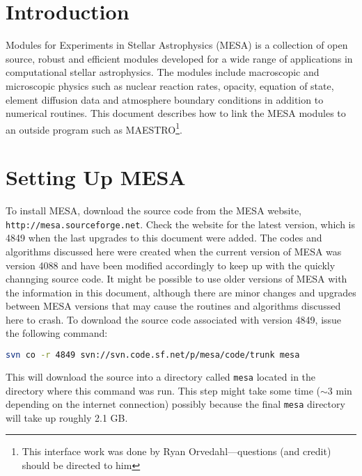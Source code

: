 
\section{Introduction}

Modules for Experiments in Stellar Astrophysics ({\sf MESA}) is a collection 
of open source, robust and efficient modules developed for a wide range of 
applications in computational stellar astrophysics. The modules include 
macroscopic and microscopic physics such as nuclear reaction rates, opacity, 
equation of state, element diffusion data and atmosphere boundary conditions 
in addition to numerical routines. This document describes how to link the 
{\sf MESA} modules to an outside program such as {\sf MAESTRO}\footnote{This
  interface work was done by Ryan Orvedahl---questions (and credit)
  should be directed to him}.


\section{Setting Up {\sf MESA}}
\label{sec:setupmesa}

To install {\sf MESA}, download the source code from the {\sf MESA} website, 
{\tt http://mesa.sourceforge.net}. Check the website for the latest version, 
which is 4849 when the last upgrades to this document were added. The codes 
and algorithms 
discussed here were created when the current version of {\sf MESA} was 
version 4088 and have been modified accordingly to keep up with the quickly 
channging source code. It might be possible to use older versions of 
{\sf MESA} with 
the information in this document, although there are minor changes and 
upgrades between {\sf MESA} versions that may cause the routines and algorithms 
discussed here to crash. To download the source code associated with version 
4849, issue the following command:
\begin{lstlisting}[language=bash,mathescape=false]
  svn co -r 4849 svn://svn.code.sf.net/p/mesa/code/trunk mesa
\end{lstlisting}
This will download the source into a directory called {\tt mesa} located 
in the directory where this command was run. This step might take some time 
($\sim$3 min depending on the internet connection) possibly because the 
final {\tt mesa} directory will take up roughly 2.1 GB.

